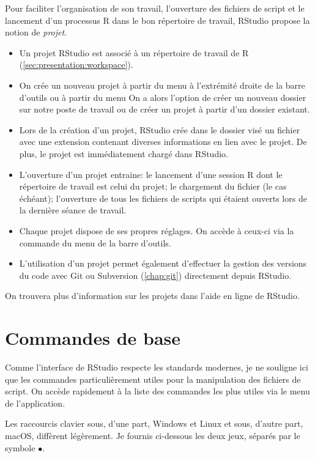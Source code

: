 Pour faciliter l'organisation de son travail, l'ouverture des fichiers
de script et le lancement d'un processus R dans le bon répertoire de
travail, RStudio propose la notion de \emph{projet}.
\begin{itemize}
\item Un projet RStudio est associé à un répertoire de travail de R
  (\autoref{sec:presentation:workspace}).
\item On crée un nouveau projet à partir du menu  à
  l'extrémité droite de la barre d'outils ou à partir du menu
   On a alors l'option de créer un nouveau
  dossier sur notre poste de travail ou de créer un projet à partir
  d'un dossier existant.
\item Lors de la création d'un projet, RStudio crée dans le dossier
  visé un fichier avec une extension  contenant diverses
  informations en lien avec le projet. De plus, le projet est
  immédiatement chargé dans RStudio.
\item L'ouverture d'un projet entraine: le lancement d'une session R
  dont le répertoire de travail est celui du projet; le
  chargement du fichier  (le cas échéant); l'ouverture de
  tous les fichiers de scripts qui étaient ouverts lors de la dernière
  séance de travail.
\item Chaque projet dispose de ses propres réglages. On accède à
  ceux-ci via la commande  du menu
   de la barre d'outils.
\item L'utilisation d'un projet permet également d'effectuer la
  gestion des versions du code avec Git ou Subversion
  (\autoref{chap:git}) directement depuis RStudio.
\end{itemize}

On trouvera plus d'information sur les projets dans l'aide en ligne
de RStudio.


\section{Commandes de base}
\label{sec:rstudio:commandes}

Comme l'interface de RStudio respecte les standards modernes, je ne
souligne ici que les commandes particulièrement utiles pour la
manipulation des fichiers de script. On accède rapidement à la liste
des commandes les plus utiles via le menu  de
l'application.

Les raccourcis clavier sous, d'une part, Windows et Linux et sous,
d'autre part, macOS, diffèrent légèrement. Je fournis ci-dessous
les deux jeux, séparés par le symbole $\bullet$.

